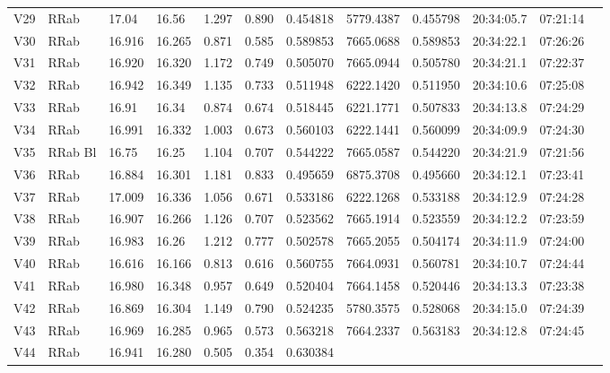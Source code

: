 \documentclass[journal]{rmaa}
\newcommand{\1}{\'{\i}}
\begin{document}
\begin{table*}
\begin{center}
\begin{tabular}{llllllllllll}
V29       & RRab   &17.04   & 16.56  &  1.297  & 0.890  & 0.454818
        & 5779.4387    & 0.455798   & 20:34:05.7  & 07:21:14\\
V30       & RRab   &16.916     &16.265  &  0.871  & 0.585  & 0.589853
        & 7665.0688     & 0.589853   & 20:34:22.1  & 07:26:26\\
V31       & RRab   &16.920    &16.320  &  1.172  & 0.749  & 0.505070
        &  7665.0944    & 0.505780   & 20:34:21.1  & 07:22:37\\
V32       & RRab   &16.942   & 16.349  &  1.135  & 0.733  & 0.511948
        & 6222.1420    & 0.511950   & 20:34:10.6 &  07:25:08\\
V33       & RRab   &16.91    & 16.34  &  0.874  & 0.674  & 0.518445
        & 6221.1771     &  0.507833  & 20:34:13.8 &  07:24:29\\
V34       & RRab   &16.991    & 16.332  &  1.003  & 0.673  & 0.560103
        & 6222.1441    & 0.560099  & 20:34:09.9 &  07:24:30\\
V35       & RRab Bl    &16.75  & 16.25  & 1.104   & 0.707  &0.544222
        & 7665.0587     &0.544220   & 20:34:21.9 &  07:21:56\\
V36       & RRab     & 16.884   & 16.301  &1.181  & 0.833  &0.495659
       & 6875.3708      & 0.495660   & 20:34:12.1  & 07:23:41\\
V37       & RRab      &17.009  &16.336 & 1.056  & 0.671 &  0.533186
       & 6222.1268     &0.533188     & 20:34:12.9 &  07:24:28\\
V38      & RRab    &16.907 &16.266 &1.126   & 0.707   & 0.523562
       & 7665.1914    &0.523559 &20:34:12.2  & 07:23:59\\
V39       & RRab     &16.983 &16.26& 1.212  & 0.777  & 0.502578
       & 7665.2055       &0.504174   & 20:34:11.9 &  07:24:00\\
V40       & RRab     &16.616 & 16.166  &  0.813   & 0.616   &0.560755
        & 7664.0931    & 0.560781     &20:34:10.7  & 07:24:44\\
V41       & RRab     & 16.980 &16.348  &  0.957   & 0.649   &0.520404
        & 7664.1458    & 0.520446    &20:34:13.3  & 07:23:38\\
V42       & RRab     & 16.869 &16.304  &  1.149   & 0.790   &0.524235
        & 5780.3575    & 0.528068    &20:34:15.0 &  07:24:39\\
V43       & RRab     & 16.969 & 16.285  &  0.965   & 0.573   &0.563218
        & 7664.2337    & 0.563183     &20:34:12.8 &  07:24:45\\
V44       & RRab      &16.941 &16.280 &  0.505    & 0.354 & 0.630384

\end{tabular}
\end{center}
\end{table*}
\end{document}
